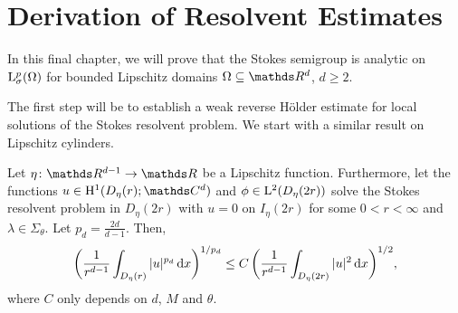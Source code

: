 \chapter{Derivation of Resolvent Estimates}

In this final chapter, we will prove that the Stokes semigroup is analytic on $\mathrm{L}^p_\sigma(\Omega)$ for bounded Lipschitz domains $\Omega \subseteq \R^d$, $d \geq 2$.

The first step will be to establish a weak reverse H\"older estimate for local solutions of the Stokes resolvent problem. 
We start with a similar result on Lipschitz cylinders.

\begin{lem}
  \label{lem:reverseHoelderCylinder}
  Let $\eta \colon \R^{d - 1} \to \R$ be a Lipschitz function.
  Furthermore, let the functions $u \in \HH^1(D_\eta(r); \C^d)$ and $\phi \in \mathrm{L}^2(D_\eta(2r))$ solve the Stokes resolvent problem in $D_\eta(2r)$ with $u = 0$ on $I_\eta(2r)$ for some $0 < r < \infty$ and $\lambda \in \Sigma_\theta$.
  Let $p_d = \frac{2d}{d - 1}$.
  Then,
  \begin{align}
    \label{eq:reverseHoelderCylinder}
    \bigg( \frac{1}{r^{d -1 }}\int_{D_\eta(r)} |u|^{p_d} \, {\operatorname{d}\!{x}} \bigg)^{1/p_d} \leq C \, \bigg( \frac{1}{r^{d - 1}} \int_{D_\eta(2r)} |u|^2 \, {\operatorname{d}\!{x}} \bigg)^{1/2},
  \end{align}
  where $C$ only depends on $d$, $M$ and $\theta$.
\end{lem}

